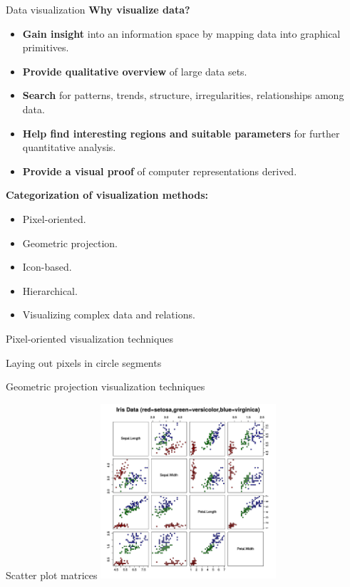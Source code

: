 \documentclass[aspectratio=169,t]{beamer}
\begin{document}
  { 
    \begin{frame}{Data visualization}
    \textbf{Why visualize data?}
    \begin{itemize}
      \item \textbf{Gain insight} into an information space by mapping data into graphical primitives.
      \item \textbf{Provide qualitative overview} of large data sets.
      \item \textbf{Search} for patterns, trends, structure, irregularities, relationships among data.
      \item \textbf{Help find interesting regions and suitable parameters} for further quantitative analysis.
      \item \textbf{Provide a visual proof} of computer representations derived.
    \end{itemize}
    \textbf{Categorization of visualization methods:}
    \begin{itemize}
      \item Pixel-oriented.
      \item Geometric projection.
      \item Icon-based.
      \item Hierarchical.
      \item Visualizing complex data and relations.
    \end{itemize}
    \end{frame}
  }

  { 
    \begin{frame}{Pixel-oriented visualization techniques}
    
    \end{frame}
  }

  { 
    \begin{frame}{Laying out pixels in circle segments}
    
    \end{frame}
  }

  { 
    \begin{frame}{Geometric projection visualization techniques}
    
    \end{frame}
  }

  { 
    \begin{frame}{Scatter plot matrices}
    \centering
    \includegraphics[height=6.5cm]{img/scatterplot_matrix.pdf}
    \end{frame}
  }
\end{document}
